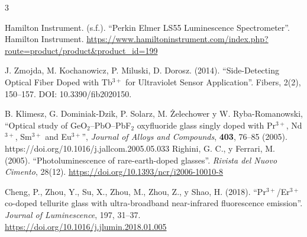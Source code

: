 \begin{thebibliography}{3}

	Hamilton Instrument. (s.f.). “Perkin Elmer LS55 Luminescence Spectrometer”. Hamilton Instrument. \url{https://www.hamiltoninstrument.com/index.php?route=product/product\&product_id=199}

	J. Zmojda, M. Kochanowicz, P. Miluski, D. Dorosz. (2014). “Side-Detecting Optical Fiber Doped with Tb$^{3+}$ for Ultraviolet Sensor Application”. Fibers, 2(2), 150--157. DOI: 10.3390/fib2020150.

B. Klimesz, G. Dominiak-Dzik, P. Solarz, M. Żelechower y W. Ryba-Romanowski,
``Optical study of GeO$_2$--PbO--PbF$_2$ oxyfluoride glass singly doped with Pr$^{3+}$, Nd$^{3+}$, Sm$^{3+}$ and Eu$^{3+}$'', \textit{Journal of Alloys and Compounds}, \textbf{403}, 76--85 (2005). https://doi.org/10.1016/j.jallcom.2005.05.033
Righini, G. C., y Ferrari, M. (2005).
“Photoluminescence of rare-earth-doped glasses”.
\textit{Rivista del Nuovo Cimento}, 28(12).
\url{https://doi.org/10.1393/ncr/i2006-10010-8}

Cheng, P., Zhou, Y., Su, X., Zhou, M., Zhou, Z., y Shao, H. (2018).
“Pr$^{3+}$/Er$^{3+}$ co-doped tellurite glass with ultra-broadband
near-infrared fluorescence emission”.
\textit{Journal of Luminescence}, 197, 31--37.
\url{https://doi.org/10.1016/j.jlumin.2018.01.005}
\end{thebibliography}
